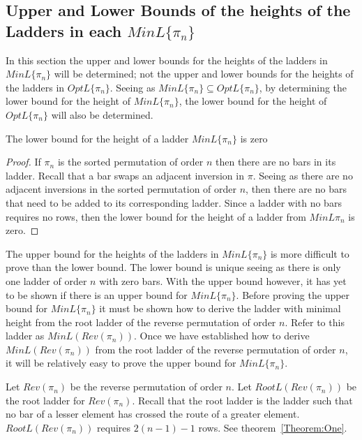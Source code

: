 \subsection{Upper and Lower Bounds of the heights of the Ladders in each $MinL\{\pi_{n}\}$}
In this section the upper and lower bounds for the heights of the ladders in $MinL\{\pi_{n}\}$ will be determined;
not the upper and lower bounds for the heights of the ladders in $OptL\{\pi_{n}\}$. Seeing as $MinL\{\pi_{n}\}\subseteq OptL\{\pi_{n}\}$, 
by determining the lower bound for the height of $MinL\{\pi_{n}\}$, the lower bound for the height of $OptL\{\pi_{n}\}$ will also be determined. 
\begin{lemma}
    The lower bound for the height of a ladder $MinL\{\pi_{n}\}$ is zero
\end{lemma} 
\begin{proof}
    If $\pi_{n}$ is the sorted permutation of order $n$ then there are no 
    bars in its ladder. Recall that a bar swaps an adjacent inversion in $\pi$.
    Seeing as there are no adjacent inversions in the sorted permutation of 
    order $n$, then there are no bars that need to be added to its corresponding 
    ladder. Since a ladder with no bars requires no rows, then the lower 
    bound for the height of a ladder from $MinL{\pi_{n}}$ is zero. 
\end{proof}\par 
The upper bound for the heights of the ladders in $MinL\{\pi_{n}\}$ is more difficult to prove than the lower bound. 
The lower bound is unique seeing as there is only one ladder of order $n$ with zero bars. 
With the upper bound however, it has yet to be shown if there is an upper bound for 
$MinL\{\pi_{n}\}$. Before proving the upper bound for $MinL\{\pi_{n}\}$ it must be shown how to 
derive the ladder with minimal height from the root ladder of the reverse permutation of order $n$.
Refer to this ladder as $MinL(Rev(\pi_{n}))$.
Once we have established how to derive $MinL(Rev(\pi_{n}))$ from the root ladder 
of the reverse permutation of order $n$, it will be relatively easy to prove the upper bound 
for $MinL\{\pi_{n}\}$.\par 
 Let $Rev(\pi_{n})$ be the reverse permutation of order 
 $n$.
 Let $RootL(Rev(\pi_{n}))$ be the root ladder for $Rev(\pi_{n})$. Recall that the root ladder is the ladder such 
    that no bar of a lesser element has crossed the route of a greater element. $RootL(Rev(\pi_{n}))$ requires 
    $2(n-1)-1$ rows. See theorem~\ref{Theorem:One}.\par 
   
